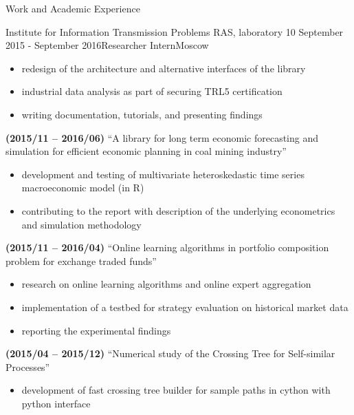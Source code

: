 \documentclass{resume} %
\begin{document}
\begin{rSection}{Work and Academic Experience}
\begin{rSubsection}{
        Institute for Information Transmission Problems RAS, laboratory 10
    }{September 2015 - September 2016}{Researcher Intern}{Moscow}
\begin{itemize}
        \item redesign of the architecture and alternative interfaces of the library

        \item industrial data analysis as part of securing TRL5 certification

        \item writing documentation, tutorials, and presenting findings
    \end{itemize}

    \item \textbf{(2015/11 -- 2016/06)}
    ``A library for long term economic forecasting and simulation for efficient economic planning in coal mining industry''
    \begin{itemize}
        \item development and testing of multivariate heteroskedastic time series macroeconomic model (in R)

        \item contributing to the report with description of the underlying econometrics and simulation methodology
    \end{itemize}

    \item \textbf{(2015/11 -- 2016/04)}
    ``Online learning algorithms in portfolio composition problem for exchange traded funds''
    \begin{itemize}
        \item research on online learning algorithms and online expert aggregation

        \item implementation of a testbed for strategy evaluation on historical market data

        \item reporting the experimental findings
    \end{itemize}

    \item \textbf{(2015/04 -- 2015/12)}
    ``Numerical study of the Crossing Tree for Self-similar Processes''
    \begin{itemize}
        \item development of fast crossing tree builder for sample paths in cython with python interface


\end{itemize}
\end{rSubsection}
\end{rSection}
\end{document}
